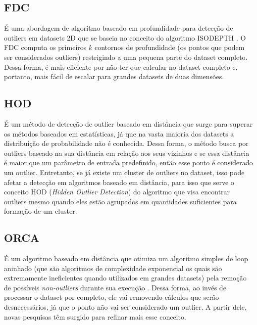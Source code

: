 \subsection{FDC}

É uma abordagem de algoritmo baseado em profundidade \cite{Johnson:1998:FCD:3000292.3000332} para detecção de outliers em datasets 2D que se baseia no conceito do algoritmo ISODEPTH \cite{RUTS1996}. O FDC computa os primeiros $k$ contornos de profundidade (os pontos que podem ser considerados outliers) restrigindo a uma pequena parte do dataset completo. Dessa forma, é mais eficiente por não ter que calcular no dataset completo e, portanto, mais fácil de escalar para grandes datasets de duas dimensões.

\subsection{HOD}

É um método de detecção de outlier baseado em distância \cite{Xu2016} que surge para superar os métodos baseados em estatísticas, já que na vasta maioria dos datasets a distribuição de probabilidade não é conhecida. Dessa forma, o método busca por outliers baseado na sua distância em relação aos seus vizinhos e se essa distância é maior que um parâmetro de entrada predefinido, então esse ponto é considerado um outlier. Entretanto, se já existe um cluster de outliers no dataset, isso pode afetar a detecção em algoritmos baseado em distância, para isso que serve o conceito HOD (\textit{Hidden Outlier Detection}) do algoritmo que visa encontrar outliers mesmo quando eles estão agrupados em quantidades suficientes para formação de um cluster.

\subsection{ORCA}

É um algoritmo baseado em distância \cite{Bay:2003:MDO:956750.956758} que otimiza um algoritmo simples de loop aninhado (que são algoritmos de complexidade exponencial os quais são extremamente ineficientes quando utilizados em grandes datasets) pela remoção de possíveis \textit{non-outliers} durante sua execução \cite{Knorr:1999:FIK:645925.671529,Knorr:2000:DOA:764212.764218,Ramaswamy:2000:EAM:335191.335437}. Dessa forma, ao invés de processar o dataset por completo, ele vai removendo cálculos que serão desnecessários, já que o ponto não vai ser considerado um outlier. A partir dele, novas pesquisas têm surgido para refinar mais esse conceito. 

